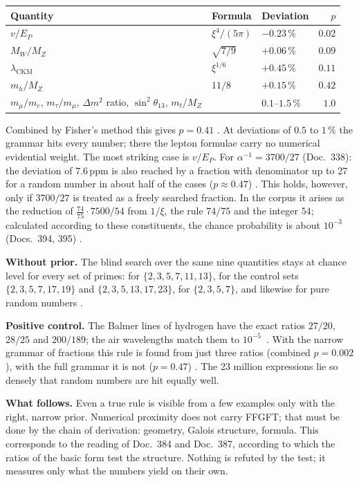 \begin{center}
\small
\begin{tabular}{@{}lllr@{}}
\toprule
\textbf{Quantity} & \textbf{Formula} & \textbf{Deviation} & \textbf{$p$} \\
\midrule
$v/E_P$ & $\xi^4/(5\pi)$ & $-0.23\,\%$ & $0.02$ \\
$M_W/M_Z$ & $\sqrt{7/9}$ & $+0.06\,\%$ & $0.09$ \\
$\lambda_{\mathrm{CKM}}$ & $\xi^{1/6}$ & $+0.45\,\%$ & $0.11$ \\
$m_h/M_Z$ & $11/8$ & $+0.15\,\%$ & $0.42$ \\
$m_\mu/m_e$, $m_\tau/m_\mu$, $\Delta m^2$ ratio, $\sin^2\theta_{13}$, $m_t/M_Z$ &  & $0.1$--$1.5\,\%$ & $1.0$ \\
\bottomrule
\end{tabular}
\end{center}

\noindent Combined by Fisher's method this gives $p=0.41$ \KM. At deviations of $0.5$ to $1\,\%$ the
grammar hits every number; there the lepton formulae carry no numerical evidential weight. The most
striking case is $v/E_P$. For $\alpha^{-1}=3700/27$ (Doc.~338): the deviation of $7.6$\,ppm is also
reached by a fraction with denominator up to 27 for a random number in about half of the cases
($p\approx0.47$) \KM. This holds, however, only if $3700/27$ is treated as a freely searched
fraction. In the corpus it arises as the reduction of $\tfrac{74}{75}\cdot7500/54$ from $1/\xi$, the
rule $74/75$ and the integer $54$; calculated according to these constituents, the chance
probability is about $10^{-3}$ (Docs.~394, 395) \KM.

\textbf{Without prior.} The blind search over the same nine quantities stays at chance level for every
set of primes: for $\{2,3,5,7,11,13\}$, for the control sets $\{2,3,5,7,17,19\}$ and
$\{2,3,5,13,17,23\}$, for $\{2,3,5,7\}$, and likewise for pure random numbers \KM.

\textbf{Positive control.} The Balmer lines of hydrogen have the exact ratios $27/20$, $28/25$ and
$200/189$; the air wavelengths match them to $10^{-5}$ \QM\,\cite{NIST}. With the narrow grammar of
fractions this rule is found from just three ratios (combined $p=0.002$), with the full grammar it is
not ($p=0.47$) \KM. The 23 million expressions lie so densely that random numbers are hit equally well.

\textbf{What follows.} Even a true rule is visible from a few examples only with the right, narrow
prior. Numerical proximity does not carry FFGFT; that must be done by the chain of derivation:
geometry, Galois structure, formula. This corresponds to the reading of Doc.~384 and Doc.~387,
according to which the ratios of the basic form test the structure. Nothing is refuted by the test;
it measures only what the numbers yield on their own.

